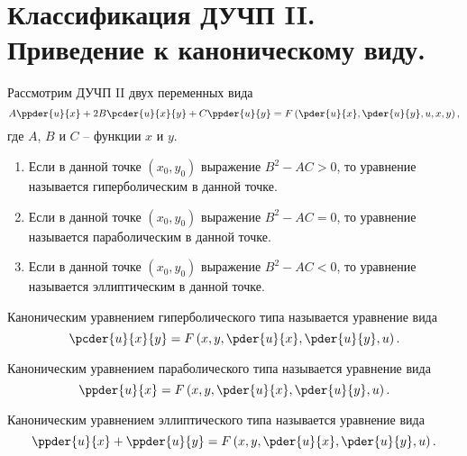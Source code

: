 \chapter{Классификация ДУЧП II. Приведение к каноническому виду.}

Рассмотрим ДУЧП II двух переменных вида
\[
    A\ppder{u}{x} + 2B\pcder{u}{x}{y} + C\ppder{u}{y} = F\left(\pder{u}{x},
    \pder{u}{y}, u, x, y\right),
\]
где \( A \), \( B \) и \( C \) -- функции \( x \) и \( y \).
\begin{enumerate}
    \item Если в данной точке \( (x_0, y_0) \) выражение \( B^2 - AC > 0 \),
    то уравнение называется гиперболическим в данной точке.
    \item Если в данной точке \( (x_0, y_0) \) выражение \( B^2 - AC = 0 \),
    то уравнение называется параболическим в данной точке.
    \item Если в данной точке \( (x_0, y_0) \) выражение \( B^2 - AC < 0 \),
    то уравнение называется эллиптическим в данной точке.
\end{enumerate}

Каноническим уравнением гиперболического типа называется уравнение вида
\[
    \pcder{u}{x}{y} = F\left(x, y, \pder{u}{x}, \pder{u}{y}, u\right).
\]

Каноническим уравнением параболического типа называется уравнение вида
\[
    \ppder{u}{x} = F\left(x, y, \pder{u}{x}, \pder{u}{y}, u\right).
\]

Каноническим уравнением эллиптического типа называется уравнение вида
\[
    \ppder{u}{x} + \ppder{u}{y} = F\left(x, y, \pder{u}{x}, \pder{u}{y}, u
    \right).
\]

